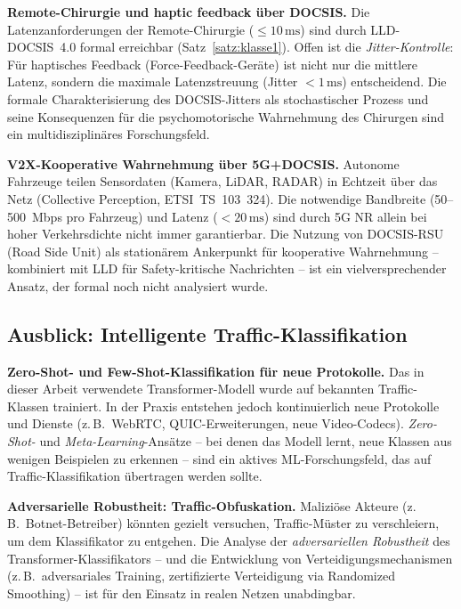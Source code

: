 ﻿\documentclass[a4paper,12pt]{article}
\theoremstyle{definition}
\begin{document}
\textbf{Remote-Chirurgie und haptic feedback \"{u}ber DOCSIS.}
Die Latenzanforderungen der Remote-Chirurgie ($\leq 10\,\mathrm{ms}$) sind durch
LLD-DOCSIS~4.0 formal erreichbar (Satz~\ref{satz:klasse1}). Offen ist die
\emph{Jitter-Kontrolle}: F\"{u}r haptisches Feedback (Force-Feedback-Ger\"{a}te)
ist nicht nur die mittlere Latenz, sondern die maximale Latenzstreuung
(Jitter $< 1\,\mathrm{ms}$) entscheidend. Die formale Charakterisierung des
DOCSIS-Jitters als stochastischer Prozess und seine Konsequenzen f\"{u}r die
psychomotorische Wahrnehmung des Chirurgen sind ein multidisziplin\"{a}res
Forschungsfeld.

\textbf{V2X-Kooperative Wahrnehmung \"{u}ber 5G+DOCSIS.}
Autonome Fahrzeuge teilen Sensordaten (Kamera, LiDAR, RADAR) in Echtzeit
\"{u}ber das Netz (Collective Perception, ETSI~TS~103~324). Die notwendige
Bandbreite (50--500~Mbps pro Fahrzeug) und Latenz ($< 20\,\mathrm{ms}$) sind
durch 5G NR allein bei hoher Verkehrsdichte nicht immer garantierbar.
Die Nutzung von DOCSIS-RSU (Road Side Unit) als stationärem Ankerpunkt
f\"{u}r kooperative Wahrnehmung -- kombiniert mit LLD f\"{u}r Safety-kritische
Nachrichten -- ist ein vielversprechender Ansatz, der formal noch nicht
analysiert wurde.

\subsection{Ausblick: Intelligente Traffic-Klassifikation}

\textbf{Zero-Shot- und Few-Shot-Klassifikation f\"{u}r neue Protokolle.}
Das in dieser Arbeit verwendete Transformer-Modell wurde auf bekannten
Traffic-Klassen trainiert. In der Praxis entstehen jedoch kontinuierlich
neue Protokolle und Dienste (z.\,B.\ WebRTC, QUIC-Erweiterungen, neue
Video-Codecs). \emph{Zero-Shot-} und \emph{Meta-Learning}-Ans\"{a}tze
-- bei denen das Modell lernt, neue Klassen aus wenigen Beispielen zu
erkennen -- sind ein aktives ML-Forschungsfeld, das auf Traffic-Klassifikation
\"{u}bertragen werden sollte.

\textbf{Adversarielle Robustheit: Traffic-Obfuskation.}
Malizi\"{o}se Akteure (z.\,B.\ Botnet-Betreiber) k\"{o}nnten gezielt versuchen,
Traffic-M\"{u}ster zu verschleiern, um dem Klassifikator zu entgehen. Die
Analyse der \emph{adversariellen Robustheit} des Transformer-Klassifikators
-- und die Entwicklung von Verteidigungsmechanismen (z.\,B.\ adversariales
Training, zertifizierte Verteidigung via Randomized Smoothing) -- ist f\"{u}r
den Einsatz in realen Netzen unabdingbar.
\end{document}
